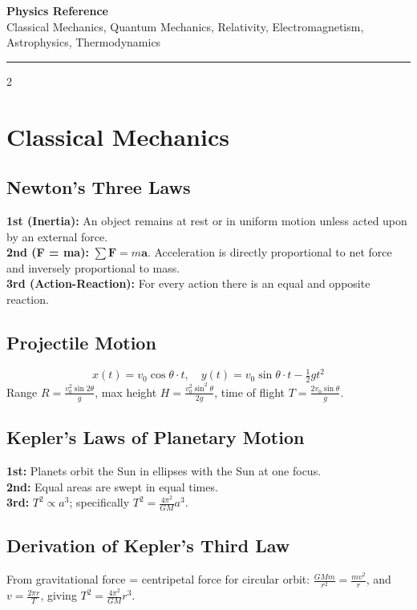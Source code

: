 \documentclass[10pt,a4paper]{article}
\begin{document}
\begin{center}
{\LARGE\bfseries\color{accent} Physics Reference}\\[4pt]
{\small Classical Mechanics, Quantum Mechanics, Relativity, Electromagnetism, Astrophysics, Thermodynamics}
\end{center}
\vspace{4pt}\hrule\vspace{6pt}

\begin{multicols}{2}

\section{Classical Mechanics}

\subsection{Newton's Three Laws}
\textbf{1st (Inertia):} An object remains at rest or in uniform motion unless acted upon by an external force.\\
\textbf{2nd (F = ma):} $\sum \mathbf{F} = m\mathbf{a}$. Acceleration is directly proportional to net force and inversely proportional to mass.\\
\textbf{3rd (Action-Reaction):} For every action there is an equal and opposite reaction.

\subsection{Projectile Motion}
\[
x(t) = v_0\cos\theta \cdot t, \quad y(t) = v_0\sin\theta \cdot t - \tfrac{1}{2}gt^2
\]
Range $R = \frac{v_0^2\sin 2\theta}{g}$, max height $H = \frac{v_0^2\sin^2\theta}{2g}$, time of flight $T = \frac{2v_0\sin\theta}{g}$.

\subsection{Kepler's Laws of Planetary Motion}
\textbf{1st:} Planets orbit the Sun in ellipses with the Sun at one focus.\\
\textbf{2nd:} Equal areas are swept in equal times.\\
\textbf{3rd:} $T^2 \propto a^3$; specifically $T^2 = \frac{4\pi^2}{GM}a^3$.

\subsection{Derivation of Kepler's Third Law}
From gravitational force = centripetal force for circular orbit:
$\frac{GMm}{r^2} = \frac{mv^2}{r}$, and $v = \frac{2\pi r}{T}$, giving $T^2 = \frac{4\pi^2}{GM}r^3$.


\end{multicols}
\end{document}
